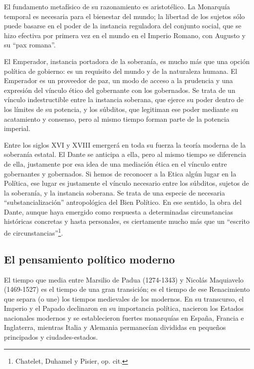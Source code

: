 \documentclass[
]{book}
\begin{document}
El fundamento metafísico de su razonamiento es aristotélico. La Monarquía temporal es necesaria para el bienestar del mundo; la libertad de los sujetos sólo puede basarse en el poder de la instancia reguladora del conjunto social, que se hizo efectiva por primera vez en el mundo en el Imperio Romano, con Augusto y su ``pax romana''.

El Emperador, instancia portadora de la soberanía, es mucho más que una opción política de gobierno: es un requisito del mundo y de la naturaleza humana. El Emperador es un proveedor de paz, un modo de acceso a la prudencia y una expresión del vínculo ético del gobernante con los gobernados. Se trata de un vínculo indestructible entre la instancia soberana, que ejerce su poder dentro de los límites de su potencia, y los súbditos, que legitiman ese poder mediante su acatamiento y consenso, pero al mismo tiempo forman parte de la potencia imperial.

Entre los siglos XVI y XVIII emergerá en toda su fuerza la teoría moderna de la soberanía estatal. El Dante se anticipa a ella, pero al mismo tiempo se diferencia de ella, justamente por esa idea de una mediación ética en el vínculo entre gobernantes y gobernados. Si hemos de reconocer a la Etica algún lugar en la Política, ese lugar es justamente el vínculo necesario entre los súbditos, sujetos de la soberanía, y la instancia soberana. Se trata de una especie de necesaria ``substancialización'' antropológica del Bien Político. En ese sentido, la obra del Dante, aunque haya emergido como respuesta a determinadas circunstancias históricas concretas y hasta personales, es ciertamente mucho más que un ``escrito de circunstancias''\footnote{Chatelet, Duhamel y Pisier, op. cit.}.

\hypertarget{el-pensamiento-poluxedtico-moderno}{%
\subsection*{El pensamiento político moderno}\label{el-pensamiento-poluxedtico-moderno}}

El tiempo que media entre Marsilio de Padua (1274-1343) y Nicolás Maquiavelo (1469-1527) es el tiempo de una gran transición; es el tiempo de ese Renacimiento que separa (o une) los tiempos medievales de los modernos. En su transcurso, el Imperio y el Papado declinaron en su importancia política, nacieron los Estados nacionales modernos y se establecieron fuertes monarquías en España, Francia e Inglaterra, mientras Italia y Alemania permanecían divididas en pequeños principados y ciudades-estados.
\end{document}
